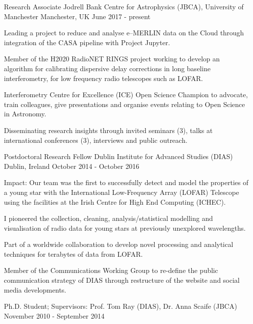 \begin{cventries}
  \cventry
    {Research Associate}
    {Jodrell Bank Centre for Astrophysics (JBCA), University of Manchester}
    {Manchester, UK}
    {June 2017 - present}
    {
      \begin{cvitems}
        \item {Leading a project to reduce and analyse e--MERLIN data on the Cloud through integration of the CASA pipeline with Project Jupyter.}
        \item {Member of the H2020 RadioNET RINGS project working to develop an algorithm for calibrating dispersive delay corrections in long baseline interferometry, for low frequency radio telescopes such as LOFAR.}
        \item {Interferometry Centre for Excellence (ICE) Open Science Champion to advocate, train colleagues, give presentations and organise events relating to Open Science in Astronomy.}
        \item {Disseminating research insights through invited seminars (3), talks at international conferences (3), interviews and public outreach.}
      \end{cvitems}
    }
\cventry
    {Postdoctoral Research Fellow}
    {Dublin Institute for Advanced Studies (DIAS)}
    {Dublin, Ireland}
    {October 2014 - October 2016}
    {
      \begin{cvitems}
        \item{Impact: Our team was the first to successfully detect and model the properties of a young star with the International Low-Frequency Array (LOFAR) Telescope using the facilities at the Irish Centre for High End Computing (ICHEC).}        
        \item {I pioneered the collection, cleaning, analysis/statistical modelling and visualisation of radio data for young stars at previously unexplored wavelengths.}
        \item {Part of a worldwide collaboration to develop novel processing and analytical techniques for terabytes of data from LOFAR.}
        \item {Member of the Communications Working Group to re-define the public communication strategy of DIAS through restructure of the website and social media developments.}
      \end{cvitems}
    }
  \cventry
    {Ph.D. Student; Supervisors: Prof. Tom Ray (DIAS), Dr. Anna Scaife (JBCA)}
    {}
    {}
    {November 2010 - September 2014}
    {
      \begin{cvitems}

\end{cvitems}}
\end{cventries}
